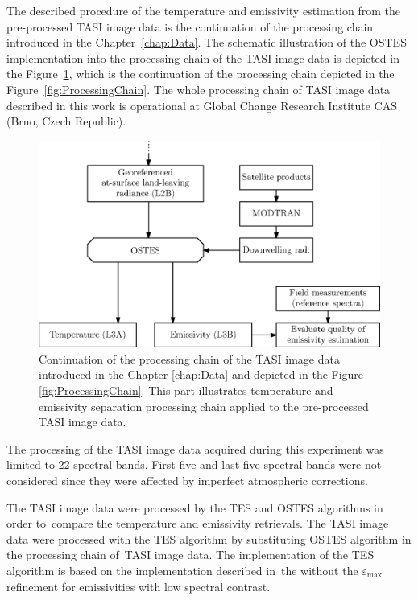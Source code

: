 The described procedure of the temperature and emissivity estimation from the pre-processed TASI image data is the continuation of the processing chain introduced in the Chapter~\ref{chap:Data}. The schematic illustration of the OSTES implementation into the processing chain of the TASI image data is depicted in the Figure~\ref{fig:OSTESProcessingChain}, which is the continuation of the processing chain depicted in the Figure~\ref{fig:ProcessingChain}. The whole processing chain of TASI image data described in this work is operational at Global Change Research Institute CAS (Brno, Czech Republic).

\begin{figure}[thb]
	\centering
	\vspace{0.7 em}
	\includegraphics[scale=1]{pics/Chapter_04/OSTES_processing_chain.eps}
	\vspace{2 em}
	\caption{Continuation of the processing chain of the TASI image data introduced in the Chapter \ref{chap:Data} and depicted in the Figure \ref{fig:ProcessingChain}. This part illustrates temperature and emissivity separation processing chain applied to the pre-processed TASI image data.}
	\label{fig:OSTESProcessingChain}
	\vspace{0.7 em}
\end{figure}

The processing of the TASI image data acquired during this experiment was limited to 22 spectral bands. First five and last five spectral bands were not considered since they were affected by imperfect atmospheric corrections.

The TASI image data were processed by the TES and OSTES algorithms in order to~compare the temperature and emissivity retrievals. The TASI image data were processed with the TES algorithm by substituting OSTES algorithm in the processing chain of~TASI image data. The implementation of the TES algorithm is based on the implementation described in~the \cite{JS12} without the $\varepsilon_\mathrm{max}$ refinement for emissivities with low spectral contrast.
 
